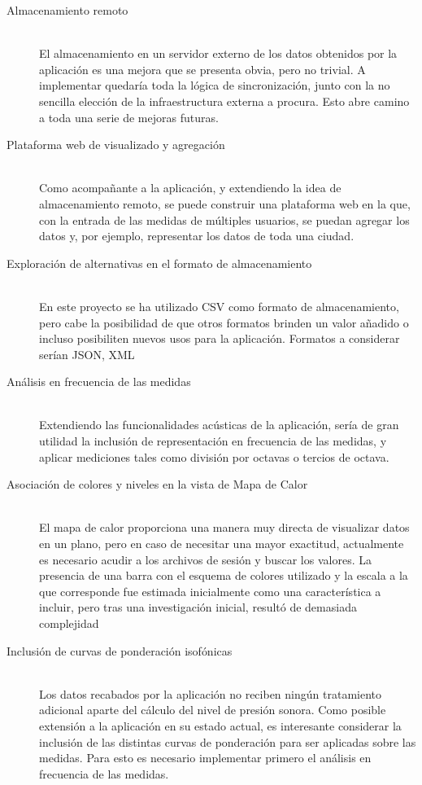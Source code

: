  \begin{description}
	\item[Almacenamiento remoto] \hfill \\	
	El almacenamiento en un servidor externo de los datos obtenidos por la aplicación es una mejora que se presenta obvia, pero no trivial. A implementar quedaría toda la lógica de sincronización, junto con la no sencilla elección de la infraestructura externa a procura. Esto abre camino a toda una serie de mejoras futuras.	
	
	\item[Plataforma web de visualizado y agregación]\hfill \\	
	Como acompañante a la aplicación, y extendiendo la idea de almacenamiento remoto, se puede construir una plataforma web en la que, con la entrada de las medidas de múltiples usuarios, se puedan agregar los datos y, por ejemplo, representar los datos de toda una ciudad.
	
    \item[Exploración de alternativas en el formato de almacenamiento]\hfill \\	
    En este proyecto se ha utilizado \ac{CSV} como formato de almacenamiento, pero cabe la posibilidad de que otros formatos brinden un valor añadido o incluso posibiliten nuevos usos para la aplicación. Formatos a considerar serían \acl{JSON}, \ac{XML}
    
    \item[Análisis en frecuencia de las medidas]\hfill \\
    Extendiendo las funcionalidades acústicas de la aplicación, sería de gran utilidad la inclusión de representación en frecuencia de las medidas, y aplicar mediciones tales como división por octavas o tercios de octava.
    
    \item[Asociación de colores y niveles en la vista de Mapa de Calor]\hifll\\
    El mapa de calor proporciona una manera muy directa de visualizar datos en un plano, pero en caso de necesitar una mayor exactitud, actualmente es necesario acudir a los archivos de sesión y buscar los valores. La presencia de una barra con el esquema de colores utilizado y la escala a la que corresponde fue estimada inicialmente como una característica a incluir, pero tras una investigación inicial, resultó de demasiada complejidad 
    
    \item[Inclusión de curvas de ponderación isofónicas]\hfill\\
    Los datos recabados por la aplicación no reciben ningún tratamiento adicional aparte del cálculo del nivel de presión sonora. Como posible extensión a la aplicación en su estado actual, es interesante considerar la inclusión de las distintas curvas de ponderación para ser aplicadas sobre las medidas. Para esto es necesario implementar primero el análisis en frecuencia de las medidas.
    

\end{description}
